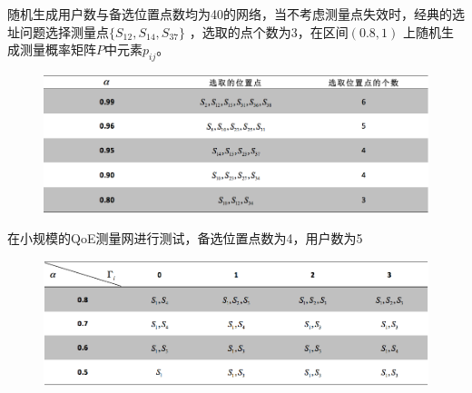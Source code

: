 \documentclass[10pt]{beamer}
\begin{document}
\begin{frame}
  随机生成用户数与备选位置点数均为40的网络，当不考虑测量点失效时，经典的选址问题选择测量点$\{S_{12},S_{14},S_{37}\}$ ，选取的点个数为3，在区间$(0.8,1)$ 上随机生成测量概率矩阵$P$中元素$p_{ij}$。
  \begin{figure}[htbp]
  \centering
  \includegraphics[width=\textwidth]{biaoge2.png}  
\end{figure}
\end{frame}
\begin{frame}
  在小规模的QoE测量网进行测试，备选位置点数为4，用户数为5
  \begin{figure}[htbp]
  \centering
  \includegraphics[width=\textwidth]{biaoge3.png}  
\end{figure}
\end{frame}
\end{document}
